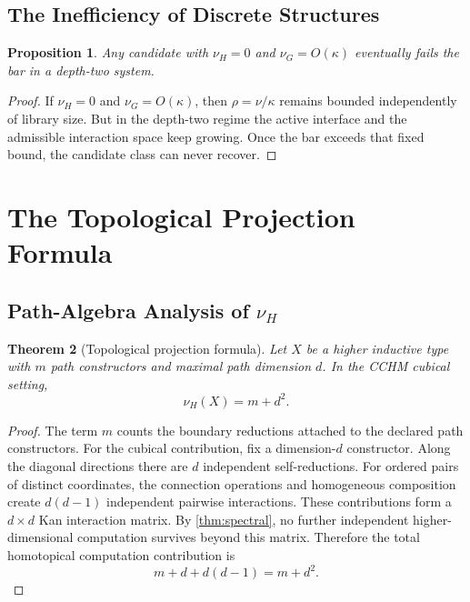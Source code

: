 \documentclass[11pt,a4paper]{article}
\theoremstyle{plain}
\newtheorem{theorem}{Theorem}[section]
\newtheorem{proposition}[theorem]{Proposition}
\theoremstyle{definition}
\theoremstyle{remark}
\begin{document}
\subsection{The Inefficiency of Discrete Structures}

\begin{proposition}
\label{prop:discrete}
Any candidate with $\nu_H=0$ and $\nu_G=O(\kappa)$ eventually fails the bar in a depth-two system.
\end{proposition}

\begin{proof}
If $\nu_H=0$ and $\nu_G=O(\kappa)$, then $\rho=\nu/\kappa$ remains bounded independently of library size.  But in the depth-two regime the active interface and the admissible interaction space keep growing.  Once the bar exceeds that fixed bound, the candidate class can never recover.
\end{proof}

\section{The Topological Projection Formula}
\label{sec:projection}

\subsection{Path-Algebra Analysis of \texorpdfstring{$\nu_H$}{nuH}}

\begin{theorem}[Topological projection formula]
\label{thm:projection}
Let $X$ be a higher inductive type with $m$ path constructors and maximal path dimension $d$.  In the CCHM cubical setting,
\[
  \nu_H(X)=m+d^2.
\]
\end{theorem}

\begin{proof}
The term $m$ counts the boundary reductions attached to the declared path constructors.  For the cubical contribution, fix a dimension-$d$ constructor.  Along the diagonal directions there are $d$ independent self-reductions.  For ordered pairs of distinct coordinates, the connection operations and homogeneous composition create $d(d-1)$ independent pairwise interactions.  These contributions form a $d\times d$ Kan interaction matrix.  By \cref{thm:spectral}, no further independent higher-dimensional computation survives beyond this matrix.  Therefore the total homotopical computation contribution is
\[
  m+d+d(d-1)=m+d^2.
\]
\end{proof}
\end{document}
